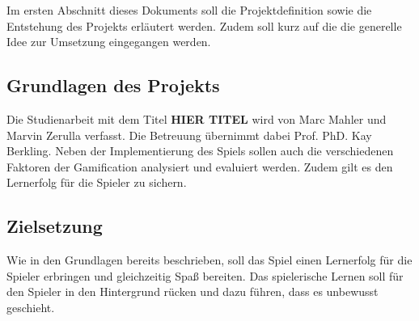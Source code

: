 Im ersten Abschnitt dieses Dokuments soll die Projektdefinition sowie die Entstehung des Projekts erläutert werden. Zudem soll kurz auf die die generelle Idee zur Umsetzung eingegangen werden.

\subsection{Grundlagen des Projekts}
Die Studienarbeit mit dem Titel \textbf{HIER TITEL} wird von Marc Mahler und Marvin Zerulla verfasst. Die Betreuung übernimmt dabei Prof. PhD. Kay Berkling. Neben der Implementierung des Spiels sollen auch die verschiedenen Faktoren der Gamification analysiert und evaluiert werden. Zudem gilt es den Lernerfolg für die Spieler zu sichern.

\subsection{Zielsetzung}
Wie in den Grundlagen bereits beschrieben, soll das Spiel einen Lernerfolg für die Spieler erbringen und gleichzeitig Spaß bereiten.
Das spielerische Lernen soll für den Spieler in den Hintergrund rücken und dazu führen, dass es unbewusst geschieht.

